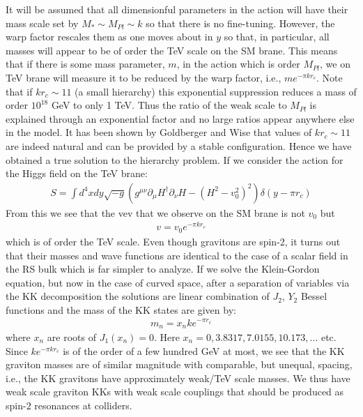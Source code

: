 It will be assumed that all dimensionful parameters in the action will have their mass scale set by $M_{*} \sim M_{Pl} \sim k$ so that there is no fine-tuning. However, the warp factor rescales them as one moves about in $y$ so that, in particular, all masses will appear to be of order the
TeV scale on the SM brane. This means that if there is some mass parameter, $m$, in the action which is order $M_{Pl}$, we on TeV brane will measure it to be reduced by the warp factor, i.e., $me^{-\pi k r_{c}}$. Note that if $kr_{c} \sim 11$ (a
small hierarchy) this exponential suppression reduces a mass of order $10^{18}$ GeV to only 1 TeV. Thus the ratio of the weak scale to $M_{Pl}$ is explained through an exponential factor and no large ratios appear anywhere else in the model. It has been shown by Goldberger and Wise \cite{Goldberger:1999un} that values of $kr_{c} \sim 11$ are indeed natural and can be provided by a stable configuration. Hence we have obtained a true solution to the hierarchy problem.
If we consider the action for the Higgs field on the TeV brane:
\begin{eqnarray}
S = \int d^{4}x dy \sqrt{-g} \left(g^{\mu\nu}\partial_{\mu}H^{\dag}\partial_{\nu}H-\left(H^{2}-v_{0}^{2} \right)^{2}\right)\delta\left(y-\pi r_{c} \right)     
\end{eqnarray}
From this we see that the vev that we observe on the SM brane is not $v_{0}$ but
\begin{eqnarray}
v = v_{0} e^{ -\pi k r_{c}}
\end{eqnarray}
which is of order the TeV scale.
Even though gravitons are spin-2, it turns out that their masses
and wave functions are identical to the case of a scalar field in the RS bulk which is far simpler to analyze. If we solve the Klein-Gordon equation, but now in the case of curved space, after a separation of variables via the KK decomposition the solutions are linear combination of $J_{2}$, $Y_{2}$ Bessel functions and the mass of the KK states are given by: 
\begin{eqnarray}
m_{n} = x_{n} k e ^{-\pi r_{c}}
\end{eqnarray}
where $x_{n}$ are roots of $J_{1}(x_{n})=0$. Here $x_{n} = 0, 3.8317, 7.0155, 10.173, \dots$ etc. Since $k e^{-\pi k r_{c}}$ is of the order of a few hundred GeV at most, we see that the KK graviton masses are of similar magnitude with comparable, but unequal, spacing, i.e., the KK gravitons have approximately weak/TeV scale masses. We thus have weak scale graviton KKs with weak scale couplings that should be produced as spin-2 resonances at colliders.

